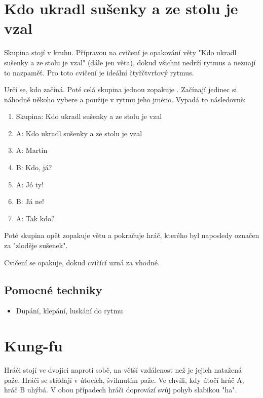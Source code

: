  
 
\needspace{5cm} \section{Kdo ukradl sušenky a ze stolu je vzal} \label{kdo ukradl sušenky a ze stolu je vzal} Skupina stojí v kruhu. Přípravou na cvičení je opakování věty "Kdo ukradl sušenky a ze stolu je vzal"{} (dále jen věta), dokud všichni nedrží rytmus a neznají to nazpaměť. Pro toto cvičení je ideální čtyřčtvrťový rytmus. 
 
Určí se, kdo začíná. Poté celá skupina jednou zopakuje . Začínají jedinec si náhodně někoho vybere a použije v rytmu jeho jméno. Vypadá to následovně: 
 
\begin{enumerate}
\item  Skupina: Kdo ukradl sušenky a ze stolu je vzal
\item  A: Kdo ukradl sušenky a ze stolu je vzal
\item  A: Martin
\item  B: Kdo, já?
\item  A: Jó ty!
\item  B: Já ne!
\item  A: Tak kdo?
\end{enumerate}
 
Poté skupina opět zopakuje větu a pokračuje hráč, kterého byl naposledy označen za "zloděje sušenek". 
 
Cvičení se opakuje, dokud cvičící uzná za vhodné. 
 
\subsection{ Pomocné techniky } \begin{itemize}
\item  Dupání, klepání, luskání do rytmu
\end{itemize}
 
 
 
 
 
\needspace{5cm} \section{Kung-fu} \label{kung-fu} Hráči stojí ve dvojici naproti sobě, na větší vzdálenost než je jejich natažená paže. Hráči se střídají v útocích, švihnutím paže. Ve chvíli, kdy útočí hráč A, hráč B uhýbá. V obou případech hráči doprovází svůj pohyb slabikou "ha". 
 
